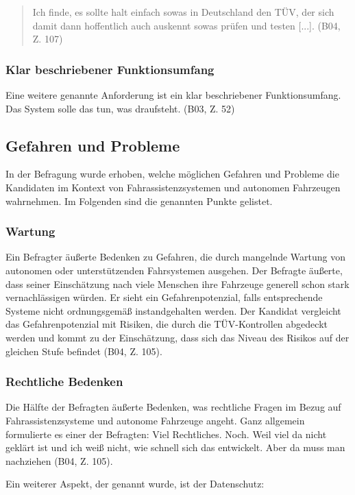 \documentclass[12pt]{article}
\begin{document}
\begin{quote}
  Ich finde, es sollte halt einfach sowas in Deutschland den TÜV, der sich damit dann hoffentlich auch auskennt sowas prüfen und testen [...]. (B04, Z. 107)
\end{quote}

\subsubsection*{Klar beschriebener Funktionsumfang}
Eine weitere genannte Anforderung ist ein klar beschriebener Funktionsumfang. Das System solle \glqq das tun, was draufsteht\grqq{}. (B03, Z. 52)


\subsection{Gefahren und Probleme}
In der Befragung wurde erhoben, welche möglichen Gefahren und Probleme die Kandidaten im Kontext von Fahrassistenzsystemen und autonomen Fahrzeugen wahrnehmen. Im Folgenden sind die genannten Punkte gelistet.

\subsubsection*{Wartung}
Ein Befragter äußerte Bedenken zu Gefahren, die durch mangelnde Wartung von autonomen oder unterstützenden Fahrsystemen ausgehen. Der Befragte äußerte, dass seiner Einschätzung nach viele Menschen ihre Fahrzeuge generell schon stark vernachlässigen würden. Er sieht ein Gefahrenpotenzial, falls entsprechende Systeme nicht ordnungsgemäß instandgehalten werden. Der Kandidat vergleicht das Gefahrenpotenzial mit Risiken, die durch die TÜV-Kontrollen abgedeckt werden und kommt zu der Einschätzung, dass sich das Niveau des Risikos auf der gleichen Stufe befindet (B04, Z. 105).

\subsubsection*{Rechtliche Bedenken}
Die Hälfte der Befragten äußerte Bedenken, was rechtliche Fragen im Bezug auf Fahrassistenzsysteme und autonome Fahrzeuge angeht. Ganz allgemein formulierte es einer der Befragten: \glqq Viel Rechtliches. Noch. Weil viel da nicht geklärt ist und ich weiß nicht, wie schnell sich das entwickelt. Aber da muss man nachziehen\grqq{} (B04, Z. 105).

Ein weiterer Aspekt, der genannt wurde, ist der Datenschutz:
\end{document}
